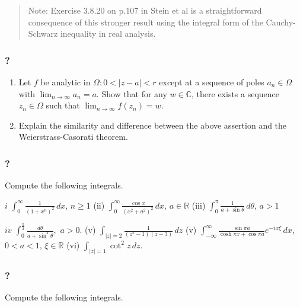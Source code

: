 \begin{quote}
Note: Exercise 3.8.20 on p.107 in Stein et al is a straightforward
consequence of this stronger result using the integral form of the
Cauchy-Schwarz inequality in real analysis.
\end{quote}

\hypertarget{section-168}{%
\subsubsection{?}\label{section-168}}

\begin{enumerate}
\def\labelenumi{(\arabic{enumi})}
\item
  Let \(f\) be analytic in \(\Omega: 0<|z-a|<r\) except at a sequence of
  poles \(a_n \in \Omega\) with \(\lim_{n \rightarrow \infty} a_n = a\).
  Show that for any \(w \in \mathbb C\), there exists a sequence
  \(z_n \in \Omega\) such that
  \(\lim_{n \rightarrow \infty} f(z_n) = w\).
\item
  Explain the similarity and difference between the above assertion and
  the Weierstrass-Casorati theorem.
\end{enumerate}

\hypertarget{section-169}{%
\subsubsection{?}\label{section-169}}

Compute the following integrals.

\(i\) \(\displaystyle \int_0^\infty \frac{1}{(1 + x^n)^2} \, dx\),
\(n \geq 1\) (ii)
\(\displaystyle \int_0^\infty \frac{\cos x}{(x^2 + a^2)^2} \, dx\),
\(a \in \mathbb R\) (iii)
\(\displaystyle \int_0^\pi \frac{1}{a + \sin \theta} \, d \theta\),
\(a>1\)

\(iv\)
\(\displaystyle \int_0^{\frac{\pi}{2}} \frac{d \theta}{a+ \sin ^2 \theta},\)
\(a >0\). (v)
\(\displaystyle \int_{|z|=2} \frac{1}{(z^{5} -1) (z-3)} \, dz\) (v)
\(\displaystyle \int_{- \infty}^{\infty} \frac{\sin \pi a}{\cosh \pi x + \cos \pi a} e^{- i x \xi} \, d x\),
\(0< a <1\), \(\xi \in \mathbb R\) (vi)
\(\displaystyle \int_{|z| = 1} \cot^2 z \, dz\).

\hypertarget{section-170}{%
\subsubsection{?}\label{section-170}}

Compute the following integrals.

